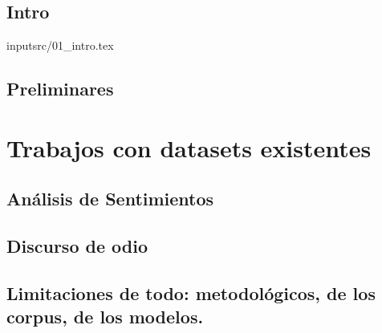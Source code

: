 \documentclass[11pt,a4paper,twoside]{tesis}
\begin{document}

\def\autor{Juan Manuel Pérez}
\def\tituloTesis{Título de tesis: \vspace{.2cm} \\ Sarasa y alcances}
\def\runtitulo{Título de tesis: \vspace{.2cm} \\ Técnicas y alcances}
\def\runtitle{Star Wars: Rebellion and Empire}
\def\director{Franco Luque}
\def\codirector{Agustín Gravano}
\def\lugar{Buenos Aires, 2021}


\frontmatter
\pagestyle{empty}


\cleardoublepage

\cleardoublepage

\cleardoublepage

\cleardoublepage
\tableofcontents

\mainmatter
\pagestyle{headings}



\chapter{Intro}
input{src/01_intro.tex}

\chapter{Preliminares}

\part{Trabajos con datasets existentes}

\chapter{Análisis de Sentimientos}


\chapter{Discurso de odio}

\chapter{Limitaciones de todo: metodológicos, de los corpus, de los modelos.}

\end{document}
